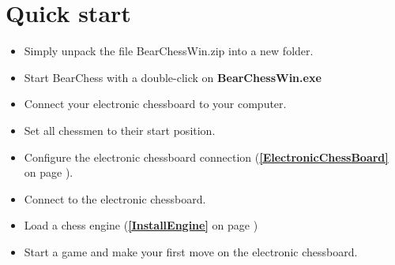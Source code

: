 \documentclass[11pt,a4paper]{article}
\begin{document}
	\newpage
	\tableofcontents
	\newpage
	
	
	\section{Quick start}
	\begin{itemize}
		\item Simply unpack the file BearChessWin.zip into a new folder.
		\item Start BearChess with a double-click on \textbf{BearChessWin.exe}
		\item Connect your electronic chessboard to your computer.
		\item Set all chessmen to their start position.
		\item Configure the electronic chessboard connection (\textbf{\ref{ElectronicChessBoard}  } on page \pageref{ElectronicChessBoard}).
		\item Connect to the electronic chessboard.
		\item Load a chess engine (\textbf{\ref{InstallEngine}  } on page \pageref{InstallEngine})
		\item Start a game and make your first move on the electronic chessboard.
	\end{itemize}
	
	
\end{document}
